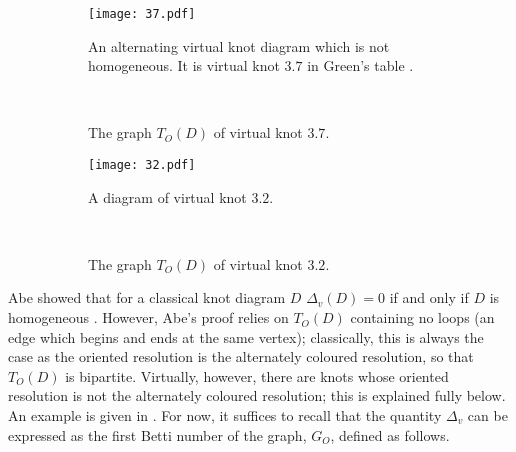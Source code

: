 \documentclass[10pt,oneside]{amsart}
\theoremstyle{definition}
\numberwithin{equation}{section}
\begin{document}
\begin{figure}
	\centering
	\begin{subfigure}[b]{0.4\textwidth}
		\begin{center}
			\texttt{[image: 37.pdf]}
			\caption{An alternating virtual knot diagram which is not homogeneous. It is virtual knot \( 3.7 \) in Green's table \cite{Green}.}
			\label{Fig:3.7diagram}
		\end{center}
	\end{subfigure}
	~
	\begin{subfigure}[b]{0.4\textwidth}
		\begin{center}
			\caption{The graph \( T_O ( D ) \) of virtual knot \( 3.7 \).}
			\label{Fig:3.7graph}
		\end{center}
	\end{subfigure}
	\caption{}\label{Fig:3.7}
\end{figure}

\begin{figure}
	\centering
	\begin{subfigure}[b]{0.4\textwidth}
		\begin{center}
			\texttt{[image: 32.pdf]}
			\caption{A diagram of virtual knot \(3.2\).}
			\label{Fig:3.2diagram}
		\end{center}
	\end{subfigure}
	~
	\begin{subfigure}[b]{0.4\textwidth}
		\begin{center}
			\caption{The graph \( T_O ( D ) \) of virtual knot \( 3.2\).}
			\label{Fig:3.72graph}
		\end{center}
	\end{subfigure}
	\caption{}\label{Fig:3.2}
\end{figure}

Abe showed that for a classical knot diagram \( D \) \( \Delta_v ( D ) = 0 \) if and only if \( D \) is homogeneous \cite{Abe2011}. However, Abe's proof relies on \( T_O ( D ) \) containing no loops (an edge which begins and ends at the same vertex); classically, this is always the case as the oriented resolution is the alternately coloured resolution, so that \( T_O ( D ) \) is bipartite. Virtually, however, there are knots whose oriented resolution is not the alternately coloured resolution; this is explained fully below. An example is given in . For now, it suffices to recall that the quantity \( \Delta_v \) can be expressed as the first Betti number of the graph, \( G_{O} \), defined as follows.
\end{document}
